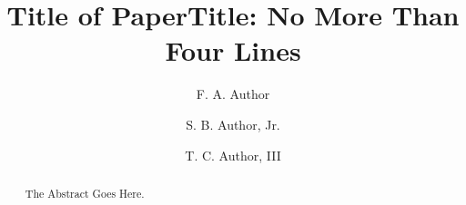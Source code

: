 
\title{Title of Paper}

\begin{abstract}
    The Abstract Goes Here. \BlindText
\end{abstract}



\title{Title: No More Than Four Lines}

\author{F. A. Author}

\author{S. B. Author, Jr.}

\author{T. C. Author, III}






\newtheorem{theorem}{Theorem}
\newtheorem{lemma}{Lemma}

\setcounter{secnumdepth}{0}
